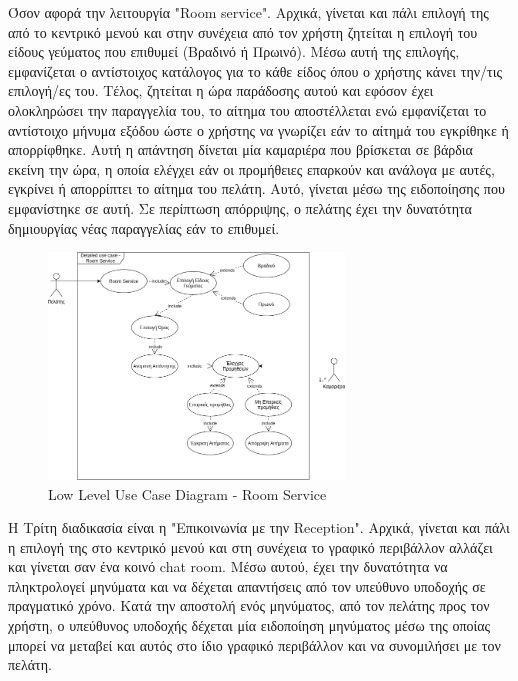 \noindent
Όσον αφορά την λειτουργία "Room service".  Αρχικά,  γίνεται και πάλι επιλογή της από το κεντρικό
μενού και στην συνέχεια από τον χρήστη ζητείται η επιλογή του είδους γεύματος που επιθυμεί (Βραδινό ή 
Πρωινό). Μέσω αυτή της επιλογής, εμφανίζεται ο αντίστοιχος κατάλογος για το κάθε είδος όπου ο χρήστης 
κάνει την/τις  επιλογή/ες του. Τέλος,  ζητείται η ώρα παράδοσης αυτού και εφόσον έχει ολοκληρώσει την 
παραγγελία του, το αίτημα του αποστέλλεται ενώ εμφανίζεται το αντίστοιχο μήνυμα εξόδου ώστε ο χρήστης 
να γνωρίζει εάν το αίτημά του εγκρίθηκε ή απορρίφθηκε.  Αυτή η απάντηση δίνεται μία καμαριέρα που βρίσκεται
σε βάρδια εκείνη την ώρα, η οποία ελέγχει εάν οι προμήθειες επαρκούν και ανάλογα με αυτές, εγκρίνει ή 
απορρίπτει το αίτημα του πελάτη. Αυτό, γίνεται μέσω της ειδοποίησης που εμφανίστηκε σε αυτή.  Σε περίπτωση
απόρριψης, ο πελάτης έχει την δυνατότητα δημιουργίας νέας παραγγελίας εάν το επιθυμεί.\\
\begin{figure}[H]
	\centering
	\includegraphics[width=0.7\textwidth]{Images/Low_level_use_case-Room service}
	\caption{Low Level Use Case Diagram - Room Service}
	\label{Low_level_use_case - Room Service}
\end{figure}
\clearpage

\noindent
H Τρίτη διαδικασία είναι η "Επικοινωνία με την Reception".  Αρχικά, γίνεται και πάλι η επιλογή της στο κεντρικό 
μενού και στη συνέχεια το γραφικό περιβάλλον αλλάζει και γίνεται σαν ένα κοινό chat room.  Μέσω αυτού, 
έχει την δυνατότητα να πληκτρολογεί μηνύματα και να δέχεται απαντήσεις από τον υπεύθυνο υποδοχής σε 
πραγματικό χρόνο. Κατά την αποστολή ενός μηνύματος, από τον πελάτης προς τον χρήστη, ο υπεύθυνος 
υποδοχής  δέχεται μία ειδοποίηση μηνύματος μέσω της οποίας μπορεί να μεταβεί και αυτός στο ίδιο γραφικό
περιβάλλον και να συνομιλήσει με τον πελάτη.  \\

